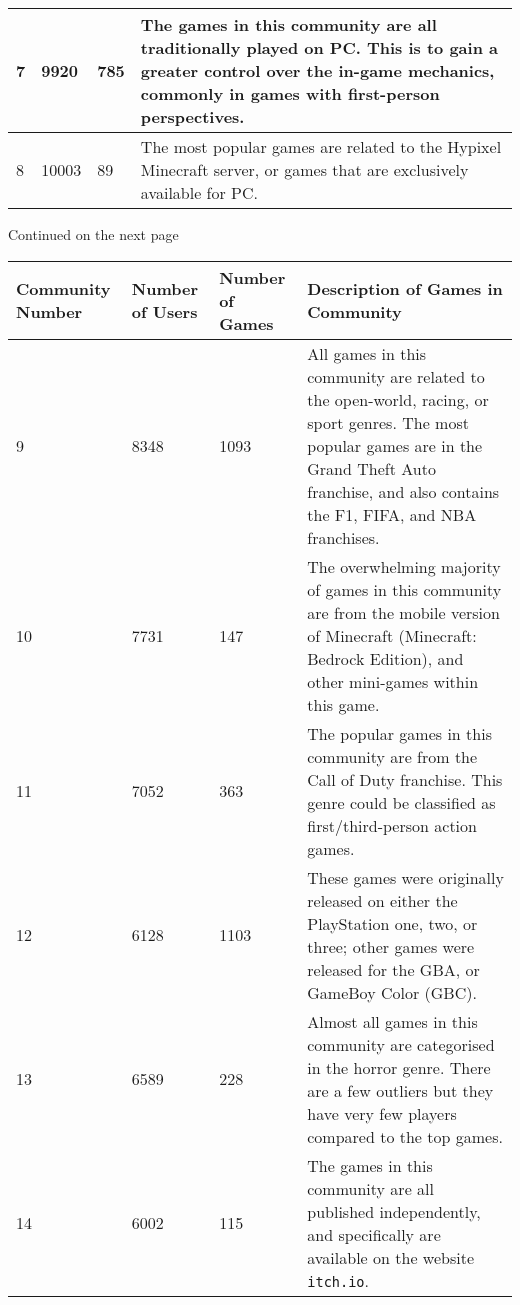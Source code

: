 \begin{table}[h]
\begin{tabular}{
        |p{}
        |p{}
        |p{}
        |p{}|}
        7 & 9920 & 785 & The games in this community are all traditionally played on PC. This is to gain a greater control over the in-game mechanics, commonly in games with first-person perspectives. \\ \hline
        8 & 10003 & 89 & The most popular games are related to the Hypixel Minecraft server, or games that are exclusively available for PC. \\ \hline
    \end{tabular}
    \label{tab:appendix}
    \begin{flushright}
        Continued on the next page
    \end{flushright}
\end{table}

\renewcommand{\arraystretch}{1.2}
\begin{table}
    \centering
    \hspace*{-1cm}\begin{tabular}{
        |p{}
        |p{}
        |p{}
        |p{}|}
        \hline
        \textbf{Community Number} & \textbf{Number of Users} & \textbf{Number of Games} & \textbf{Description of Games in Community} \\ \hline
        9 & 8348 & 1093 & All games in this community are related to the open-world, racing, or sport genres. The most popular games are in the Grand Theft Auto franchise, and also contains the F1, FIFA, and NBA franchises.\\ \hline
        10 & 7731 & 147	& The overwhelming majority of games in this community are from the mobile version of Minecraft (Minecraft: Bedrock Edition), and other mini-games within this game.\\ \hline
        11 & 7052 & 363 & The popular games in this community are from the Call of Duty franchise. This genre could be classified as first/third-person action games.\\ \hline
        12 & 6128 & 1103 & These games were originally released on either the PlayStation one, two, or three; other games were released for the GBA, or GameBoy Color (GBC).\\ \hline
        13 & 6589 & 228 & Almost all games in this community are categorised in the horror genre. There are a few outliers but they have very few players compared to the top games. \\ \hline
        14 & 6002 & 115 & The games in this community are all published independently, and specifically are available on the website \texttt{itch.io}. \\ \hline

\end{tabular}
\end{table}
